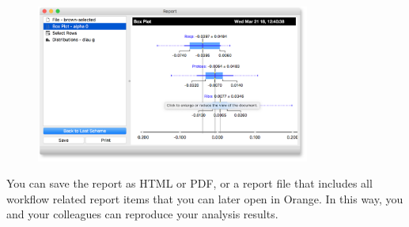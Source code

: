 \begin{figure}[h]
  \centering
  \includegraphics[width=90mm]{graphics/ch-saving/saving-fig2.png}%
  \label{fig:saveing-fig2}
\end{figure}

You can save the report as HTML or PDF, or a report file that includes all workflow related report items that you can later open in Orange. In this way, you and your colleagues can reproduce your analysis results.